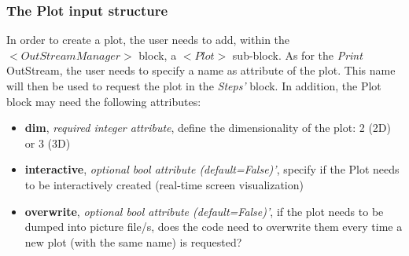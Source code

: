 \subsubsection{The Plot input structure \label{sec:PlotInputStructure}}
In order to create a plot, the user needs to add, within the $<OutStreamManager>$ block,  a $<Plot>$ sub-block. As for the \textit{Print}  OutStream, the user needs to specify a name as attribute of the plot. This name will then be used to request the plot in the \textit{Steps'} block. In addition, the Plot block may need the following attributes:
\vspace{-5mm}
\begin{itemize}
\itemsep0em
\item \textbf{dim}, \textit{required integer attribute}, define the dimensionality of the plot: 2 (2D) or 3 (3D)
\item \textbf{interactive}, \textit{optional bool attribute (default=False)'}, specify if the Plot needs to be interactively created (real-time screen visualization)
\item \textbf{overwrite}, \textit{optional bool attribute (default=False)'}, if the plot needs to be dumped into picture file/s, does the code need to overwrite them every time a new plot (with the same name) is requested?
\end{itemize}
\vspace{-5mm}

